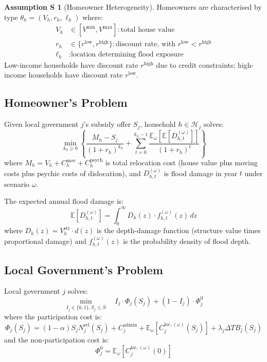 \documentclass[11pt,letterpaper]{article}
\theoremstyle{definition}
\newtheorem{assumptionS}{Assumption S}
\newcommand{\E}{\mathbb{E}}
\begin{document}
\begin{assumptionS}[Homeowner Heterogeneity]\label{ass:heterogeneity}
Homeowners are characterised by type $\theta_h = (V_h, r_h, \ell_h)$ where:
\begin{align}
V_h &\in [V^{\min}, V^{\max}] : \text{total house value} \\
r_h &\in \{r^{\text{low}}, r^{\text{high}}\} : \text{discount rate, with } r^{\text{low}} < r^{\text{high}} \\
\ell_h &: \text{location determining flood exposure}
\end{align}
Low-income households have discount rate $r^{\text{high}}$ due to credit constraints; high-income households have discount rate $r^{\text{low}}$.
\end{assumptionS}

\subsection{Homeowner's Problem}

Given local government $j$'s subsidy offer $S_j$, household $h \in \mathcal{H}_j$ solves:
\begin{equation}\label{eq:homeowner_full}
\min_{k_h \geq 0} \left\{ \frac{M_h - S_j}{(1+r_h)^{k_h}} + \sum_{t=0}^{k_h-1} \frac{\E_\omega[\E[D_{h,t}^{(\omega)}]]}{(1+r_h)^t} \right\}
\end{equation}
where $M_h = V_h + C_h^{\text{mov}} + C_h^{\text{psych}}$ is total relocation cost (house value plus moving costs plus psychic costs of dislocation), and $D_{h,t}^{(\omega)}$ is flood damage in year $t$ under scenario $\omega$.

The expected annual flood damage is:
\begin{equation}
\E[D_{h,t}^{(\omega)}] = \int_0^{\infty} D_h(z) \cdot f_{h,t}^{(\omega)}(z) \, dz
\end{equation}
where $D_h(z) = V_h^{\text{str}} \cdot d(z)$ is the depth-damage function (structure value times proportional damage) and $f_{h,t}^{(\omega)}(z)$ is the probability density of flood depth.

\subsection{Local Government's Problem}

Local government $j$ solves:
\begin{equation}\label{eq:local_full}
\min_{I_j \in \{0,1\}, S_j \leq \bar{S}} \quad I_j \cdot \Phi_j(S_j) + (1 - I_j) \cdot \Phi_j^0
\end{equation}
where the participation cost is:
\begin{equation}
\Phi_j(S_j) = (1-\alpha) S_j N_j^{\text{rel}}(S_j) + C_j^{\text{admin}} + \E_\omega[C_{j}^{\text{loc},(\omega)}(S_j)] + \lambda_j \Delta TB_j(S_j)
\end{equation}
and the non-participation cost is:
\begin{equation}
\Phi_j^0 = \E_\omega[C_{j}^{\text{loc},(\omega)}(0)]
\end{equation}
\end{document}
